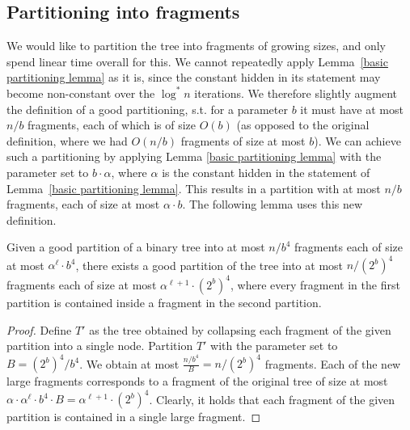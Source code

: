 \documentclass[a4paper,UKenglish]{lipics-v2016}
\theoremstyle{plain}
\begin{document}
\subsection{Partitioning into fragments}\label{section:partioioning}
We would like to partition the tree into fragments of growing sizes, and only spend linear time overall for this. We cannot repeatedly apply Lemma~\ref{basic partitioning lemma} as it is, since the constant hidden in its statement may become non-constant over the $\log^*n$ iterations. We therefore slightly augment the definition of a good partitioning, s.t. for a parameter $b$ it must have at most $n/b$ fragments, each of which is of size $O(b)$ (as opposed to the original definition, where we had $O(n/b)$ fragments of size at most $b$). We can achieve such a partitioning by applying Lemma \ref{basic partitioning lemma} with the parameter set to $b \cdot \alpha$, where $\alpha$ is the constant hidden in the statement of Lemma~\ref{basic partitioning lemma}. This results in a partition with at most $n/b$ fragments, each of size at most $\alpha \cdot b$. The following lemma uses this new definition.


\begin{lemma}\label{good partition refinement lemma}
Given a good partition of a binary tree into at most $n/b^{4}$ fragments each of size at most $\alpha^{\ell}\cdot b^{4}$, there
exists a good partition of the tree into at most $n/(2^b)^{4}$ fragments each of size at most $\alpha^{\ell+1}\cdot (2^{b})^{4}$,
where every fragment in the first partition is contained inside a fragment in the second partition.
\end{lemma}
\begin{proof}
Define $T'$ as the tree obtained by collapsing each fragment of the given partition into a single node. Partition $T'$ with the parameter set to $B= {(2^{b})^{4}}/{b^{4}}$. We obtain at most $\frac{n/b^4}{B}=n/(2^{b})^{4}$ fragments. Each of the new large fragments corresponds to a fragment of the original tree of size at most $\alpha\cdot \alpha^{\ell}\cdot b^{4}\cdot B = \alpha^{\ell+1}\cdot (2^{b})^{4}$. Clearly, it holds that each fragment of the given partition is contained in a single large fragment.
\end{proof}
\end{document}
